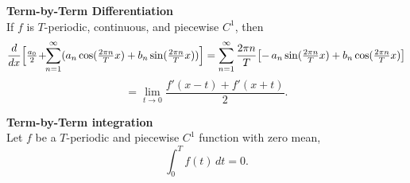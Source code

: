 \documentclass[8pt]{article}
\begin{document}
    \vspace{-20px}
    \begin{minipage}[htp]{0.6\textwidth}
        \noindent \textbf{Term-by-Term Differentiation}\\
        If $f$ is $T$-periodic, continuous, and piecewise $C^1$, then
        \[
        \frac{d}{dx}\Bigl[
          \tfrac{a_0}{2}\!+\!\!\sum_{n=1}^\infty
          (a_n\cos(\tfrac{2\pi n}{T}x)+b_n\sin(\tfrac{2\pi n}{T}x))
        \Bigr]  =
        \sum_{n=1}^\infty \frac{2\pi n}{T}\bigl[-\,a_n\sin(\tfrac{2\pi n}{T}x)+b_n\cos(\tfrac{2\pi n}{T}x)\bigr] \]\[
       = \lim_{t \to 0} \frac{f'(x - t) + f'(x + t)}{2}.
        \]
    \end{minipage}
    \hfill
    \begin{minipage}[htp]{0.35\textwidth}
        \noindent \textbf{Term-by-Term integration} \\

        Let \( f \) be a \( T \)-periodic and piecewise \( C^1 \) function with zero mean,
        \[
        \int_0^T f(t) \, dt = 0.
        \]
    \end{minipage}
\end{document}
